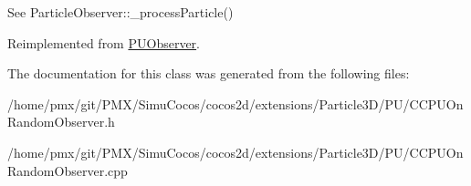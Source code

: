 See Particle\+Observer\+::\+\_\+process\+Particle() 

Reimplemented from \hyperlink{classPUObserver}{P\+U\+Observer}.



The documentation for this class was generated from the following files\+:\begin{DoxyCompactItemize}
\item 
/home/pmx/git/\+P\+M\+X/\+Simu\+Cocos/cocos2d/extensions/\+Particle3\+D/\+P\+U/C\+C\+P\+U\+On\+Random\+Observer.\+h\item 
/home/pmx/git/\+P\+M\+X/\+Simu\+Cocos/cocos2d/extensions/\+Particle3\+D/\+P\+U/C\+C\+P\+U\+On\+Random\+Observer.\+cpp\end{DoxyCompactItemize}
